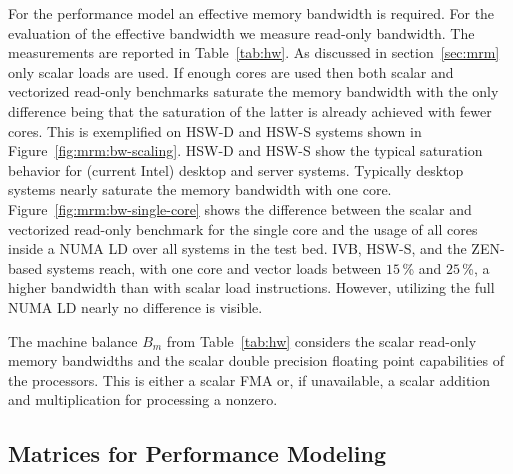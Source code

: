 {\color{blue} For the performance model an effective memory bandwidth is required.
For the evaluation of the effective bandwidth we measure read-only bandwidth.
The measurements are reported in Table~\ref{tab:hw}.}
As discussed in section~\ref{sec:mrm} only scalar loads are used.
%
If enough cores are used then both scalar and vectorized read-only benchmarks
saturate the memory bandwidth with the only difference being that the saturation of
the latter is already achieved with fewer cores.
This is exemplified on HSW-D and HSW-S systems shown in
Figure~\ref{fig:mrm:bw-scaling}.
HSW-D and HSW-S show the typical saturation behavior for (current Intel) desktop
and server systems.
Typically desktop systems nearly saturate the memory bandwidth with one core.
%
Figure~\ref{fig:mrm:bw-single-core} shows the difference between the scalar and
vectorized read-only benchmark for the single core and the usage of all cores
inside a NUMA LD over all systems in the test bed.
IVB, HSW-S, and the ZEN-based
systems reach,
with one core and vector loads between $15$\,\% and
$25$\,\%,
a higher bandwidth
than with scalar load instructions.
However, utilizing the full NUMA LD nearly no difference is visible.
%

The machine balance $B_m$ from Table~\ref{tab:hw} considers the scalar read-only
memory bandwidths and the scalar double precision floating point capabilities of
the processors.
This is either a scalar FMA or, if unavailable, a scalar addition and
multiplication for processing a nonzero.

\subsection{Matrices for Performance Modeling}

